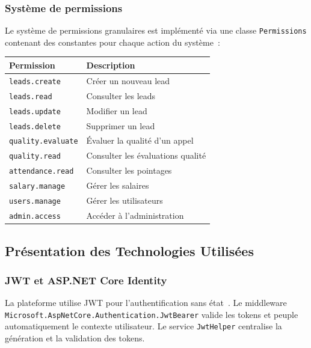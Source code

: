 \subsubsection{Système de permissions}

Le système de permissions granulaires est implémenté via une classe \texttt{Permissions}
contenant des constantes pour chaque action du système~:

\begin{center}
\begin{tabular}{|l|l|}
\hline
\textbf{Permission} & \textbf{Description} \\
\hline
\texttt{leads.create} & Créer un nouveau lead \\
\texttt{leads.read} & Consulter les leads \\
\texttt{leads.update} & Modifier un lead \\
\texttt{leads.delete} & Supprimer un lead \\
\texttt{quality.evaluate} & Évaluer la qualité d'un appel \\
\texttt{quality.read} & Consulter les évaluations qualité \\
\texttt{attendance.read} & Consulter les pointages \\
\texttt{salary.manage} & Gérer les salaires \\
\texttt{users.manage} & Gérer les utilisateurs \\
\texttt{admin.access} & Accéder à l'administration \\
\hline
\end{tabular}
\end{center}

\subsection{Présentation des Technologies Utilisées}
\label{subsec:sprint1_tech}

\subsubsection{JWT et ASP.NET Core Identity}

La plateforme utilise JWT pour l'authentification sans état~\cite{JWTRFC}. Le middleware
\texttt{Microsoft.AspNetCore.Authentication.JwtBearer} valide les tokens et peuple
automatiquement le contexte utilisateur. Le service \texttt{JwtHelper} centralise la
génération et la validation des tokens.

